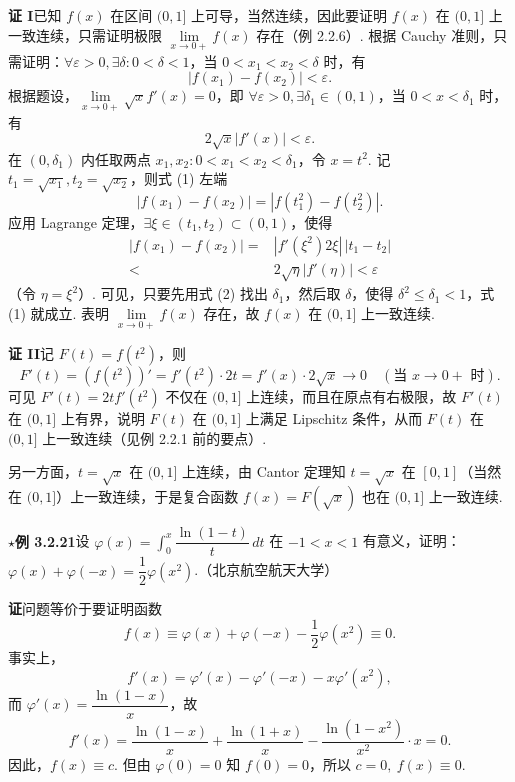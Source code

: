 \documentclass[UTF8,12pt,a4paper,fontset=fandol]{ctexart}
\begin{document}
\noindent\textbf{证 I}\quad 已知 $f(x)$ 在区间 $(0,1]$ 上可导，当然连续，因此要证明 $f(x)$ 在 $(0,1]$ 上一致连续，只需证明极限 $\lim\limits_{x\to0+}f(x)$ 存在（例 2.2.6）. 根据 Cauchy 准则，只需证明：$\forall\varepsilon>0,\exists\delta:0<\delta<1$，当 $0<x_1<x_2<\delta$ 时，有
\begin{equation}
  |f(x_1)-f(x_2)|<\varepsilon.
\tag{1}
\end{equation}
根据题设，$\lim\limits_{x\to0+}\sqrt{x}f'(x)=0$，即 $\forall\varepsilon>0,\exists\delta_1\in(0,1)$，当 $0<x<\delta_1$ 时，有
\begin{equation}
  2\sqrt{x}|f'(x)|<\varepsilon.
\tag{2}
\end{equation}
在 $(0,\delta_1)$ 内任取两点 $x_1,x_2:0<x_1<x_2<\delta_1$，令 $x=t^2$. 记 $t_1=\sqrt{x_1},t_2=\sqrt{x_2}$，则式 (1) 左端
\begin{equation}
  |f(x_1)-f(x_2)|=|f(t_1^2)-f(t_2^2)|.
\tag{3}
\end{equation}
应用 Lagrange 定理，$\exists\xi\in(t_1,t_2)\subset(0,1)$，使得
\begin{equation}
\begin{aligned}
|f(x_1)-f(x_2)|
={}& |f'(\xi^2)2\xi|\,|t_1-t_2|\\
<{}& 2\sqrt{\eta}|f'(\eta)|<\varepsilon
\end{aligned}
\tag{4}
\end{equation}
（令 $\eta=\xi^2$）.
可见，只要先用式 (2) 找出 $\delta_1$，然后取 $\delta$，使得 $\delta^2\le\delta_1<1$，式 (1) 就成立. 表明 $\lim\limits_{x\to0+}f(x)$ 存在，故 $f(x)$ 在 $(0,1]$ 上一致连续.

\noindent\textbf{证 II}\quad 记 $F(t)=f(t^2)$，则
\[
  F'(t)=(f(t^2))'=f'(t^2)\cdot2t=f'(x)\cdot2\sqrt{x}\to0\quad(\text{当 }x\to0+\text{ 时}).
\]
可见 $F'(t)=2tf'(t^2)$ 不仅在 $(0,1]$ 上连续，而且在原点有右极限，故 $F'(t)$ 在 $(0,1]$ 上有界，说明 $F(t)$ 在 $(0,1]$ 上满足 Lipschitz 条件，从而 $F(t)$ 在 $(0,1]$ 上一致连续（见例 2.2.1 前的要点）.

另一方面，$t=\sqrt{x}$ 在 $(0,1]$ 上连续，由 Cantor 定理知 $t=\sqrt{x}$ 在 $[0,1]$（当然在 $(0,1]$）上一致连续，于是复合函数 $f(x)=F(\sqrt{x})$ 也在 $(0,1]$ 上一致连续.

\noindent\textbf{$\star$例 3.2.21}\quad 设 $\varphi(x)=\int_0^x\dfrac{\ln(1-t)}t\,dt$ 在 $-1<x<1$ 有意义，证明：$\varphi(x)+\varphi(-x)=\dfrac12\varphi(x^2)$.（北京航空航天大学）

\noindent\textbf{证}\quad 问题等价于要证明函数
\[
  f(x)\equiv\varphi(x)+\varphi(-x)-\frac12\varphi(x^2)\equiv0.
\]
事实上，
\[
  f'(x)=\varphi'(x)-\varphi'(-x)-x\varphi'(x^2),
\]
而 $\varphi'(x)=\dfrac{\ln(1-x)}x$，故
\[
  f'(x)=\frac{\ln(1-x)}x+\frac{\ln(1+x)}x-\frac{\ln(1-x^2)}{x^2}\cdot x=0.
\]
因此，$f(x)\equiv c$. 但由 $\varphi(0)=0$ 知 $f(0)=0$，所以 $c=0,\ f(x)\equiv0$.
\end{document}
